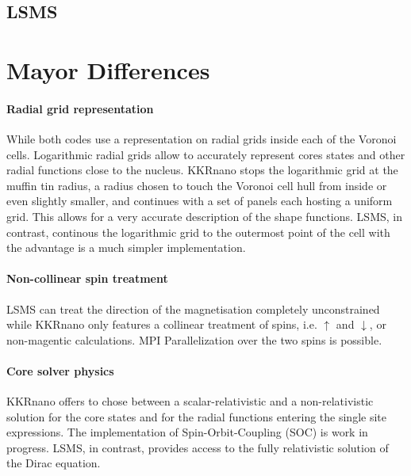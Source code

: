\documentclass{llncs}
\def\KKRnano{{KKRnano}}
\def\LSMS{{LSMS}}
\begin{document}
\subsection{LSMS} \label{section:lsms}


\section{Mayor Differences} \label{section:differ}

\paragraph{Radial grid representation}
While both codes use a representation on radial grids inside each of the Voronoi cells.
Logarithmic radial grids allow to accurately represent cores states and other radial functions
close to the nucleus. \KKRnano{} stops the logarithmic grid at the muffin tin radius,
a radius chosen to touch the Voronoi cell hull from inside or even slightly smaller, and 
continues with a set of panels each hosting a uniform grid. This allows for a very accurate
description of the shape functions. \LSMS{}, in contrast, continous the logarithmic grid
to the outermost point of the cell with the advantage is a much simpler implementation.

\paragraph{Non-collinear spin treatment}
\LSMS{} can treat the direction of the magnetisation completely unconstrained
while \KKRnano{} only features a collinear treatment of spins, i.e. $\uparrow$ and $\downarrow$, 
or non-magentic calculations. MPI Parallelization over the two spins is possible.

\paragraph{Core solver physics}
\KKRnano{} offers to chose between a scalar-relativistic and a non-relativistic solution for the core states 
and for the radial functions entering the single site expressions. 
The implementation of Spin-Orbit-Coupling (SOC) is work in progress.
\LSMS{}, in contrast, provides access to the fully relativistic solution of the Dirac equation.
%
\end{document}
